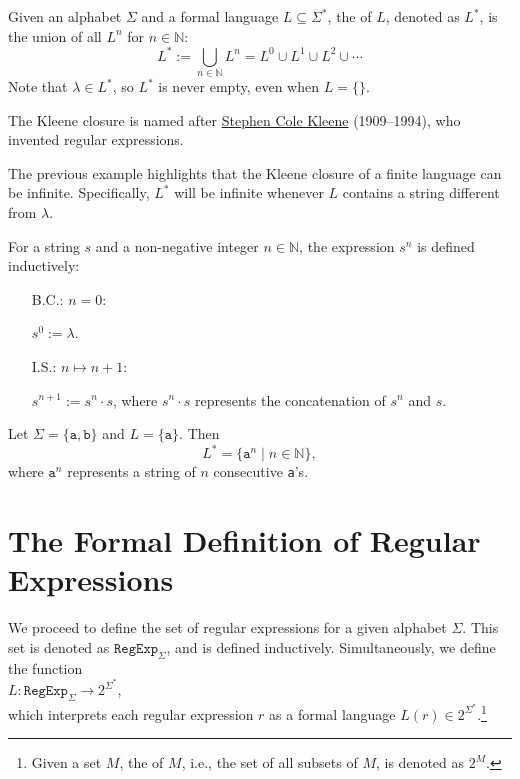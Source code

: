 \begin{Definition}
  Given an alphabet $ \Sigma $ and a formal language $ L \subseteq \Sigma^* $, the  of $ L $, denoted as $ L^* $, is the union of all $ L^n $ for $ n \in \mathbb{N} $:
  \[
  L^* := \bigcup_{n \in \mathbb{N}} L^n = L^0 \cup L^1 \cup L^2 \cup \cdots
  \]
  Note that $ \lambda \in L^* $, so $ L^* $ is never empty, even when $ L = \{\} $.

  The Kleene closure is named after \href{https://en.wikipedia.org/wiki/Stephen_Cole_Kleene}{Stephen Cole Kleene}
  (1909--1994), who invented regular expressions.
  \eox
\end{Definition}

The previous example highlights that the Kleene closure of a finite language can be infinite. Specifically, 
$L^*$ will be infinite whenever $L$ contains a string different from $\lambda$. 

\begin{Definition}
For a string $ s $ and a non-negative integer $ n \in \mathbb{N} $, the expression $ s^n $ is defined inductively:
\begin{enumerate}
\item[B.C.:] $ n = 0 $:

             $ s^0 := \lambda $.
\item[I.S.:] $ n \mapsto n + 1 $:

             $ s^{n+1} := s^n \cdot s $,  \quad where $ s^n \cdot s $ represents the concatenation of $ s^n $ and $ s $.
\eox
\end{enumerate}
\end{Definition}

\exampleEng
Let $ \Sigma = \{ \texttt{a}, \texttt{b} \} $ and $ L = \{ \texttt{a} \} $. Then
\[
L^* = \{ \texttt{a}^n \mid n \in \mathbb{N} \},
\]
where $ \texttt{a}^n $ represents a string of $ n $ consecutive \texttt{a}'s. \eox



\section{The Formal Definition of Regular Expressions}
We proceed to define the set of regular expressions for a given alphabet $ \Sigma $. This set is denoted as
$ \texttt{RegExp}_\Sigma $, and is defined inductively. Simultaneously, we define the function 
\\[0.2cm]
\hspace*{1.3cm}
$L: \texttt{RegExp}_\Sigma \rightarrow 2^{\Sigma^*}$,
\\[0.2cm]
which interprets each regular expression $ r $ as a formal language $ L(r) \in 2^{\Sigma^*} $.\footnote{
  Given a set $ M $, the  of $ M $, i.e., the set of all subsets of $ M $, is denoted as $ 2^M $.
}
\pagebreak


